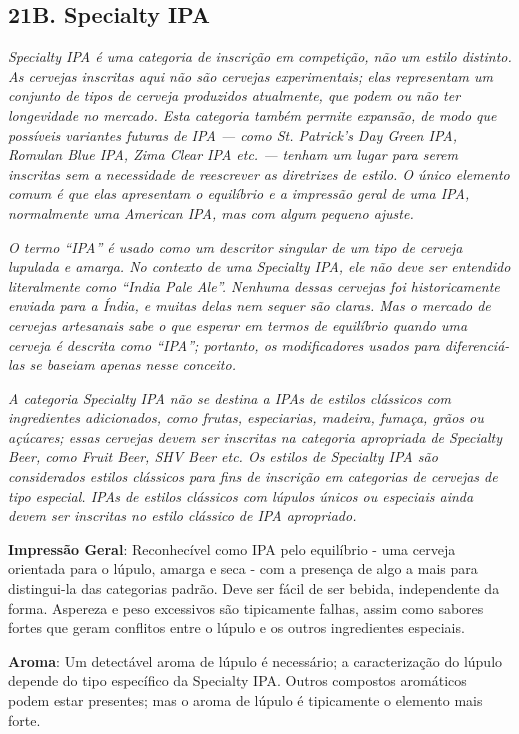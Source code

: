 \subsection*{21B. Specialty IPA}

\textit{Specialty IPA é uma categoria de inscrição em competição, não um estilo distinto. As cervejas inscritas aqui não são cervejas experimentais; elas representam um conjunto de tipos de cerveja produzidos atualmente, que podem ou não ter longevidade no mercado. Esta categoria também permite expansão, de modo que possíveis variantes futuras de IPA — como St. Patrick’s Day Green IPA, Romulan Blue IPA, Zima Clear IPA etc. — tenham um lugar para serem inscritas sem a necessidade de reescrever as diretrizes de estilo. O único elemento comum é que elas apresentam o equilíbrio e a impressão geral de uma IPA, normalmente uma American IPA, mas com algum pequeno ajuste.}

\textit{O termo “IPA” é usado como um descritor singular de um tipo de cerveja lupulada e amarga. No contexto de uma Specialty IPA, ele não deve ser entendido literalmente como “India Pale Ale”. Nenhuma dessas cervejas foi historicamente enviada para a Índia, e muitas delas nem sequer são claras. Mas o mercado de cervejas artesanais sabe o que esperar em termos de equilíbrio quando uma cerveja é descrita como “IPA”; portanto, os modificadores usados para diferenciá-las se baseiam apenas nesse conceito.}

\textit{A categoria Specialty IPA não se destina a IPAs de estilos clássicos com ingredientes adicionados, como frutas, especiarias, madeira, fumaça, grãos ou açúcares; essas cervejas devem ser inscritas na categoria apropriada de Specialty Beer, como Fruit Beer, SHV Beer etc. Os estilos de Specialty IPA são considerados estilos clássicos para fins de inscrição em categorias de cervejas de tipo especial. IPAs de estilos clássicos com lúpulos únicos ou especiais ainda devem ser inscritas no estilo clássico de IPA apropriado.}

\textbf{Impressão Geral}: Reconhecível como IPA pelo equilíbrio - uma cerveja orientada para o lúpulo, amarga e seca - com a presença de algo a mais para distingui-la das categorias padrão. Deve ser fácil de ser bebida, independente da forma. Aspereza e peso excessivos são tipicamente falhas, assim como sabores fortes que geram conflitos entre o lúpulo e os outros ingredientes especiais.

\textbf{Aroma}: Um detectável aroma de lúpulo é necessário; a caracterização do lúpulo depende do tipo específico da Specialty IPA. Outros compostos aromáticos podem estar presentes; mas o aroma de lúpulo é tipicamente o elemento mais forte.

